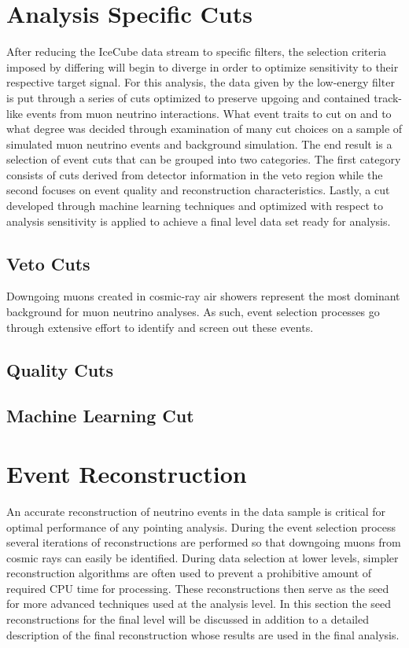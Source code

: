 \documentclass{gatech-thesis}
\begin{document}
\section{Analysis Specific Cuts}
After reducing the IceCube data stream to specific filters, the selection criteria imposed by differing will begin to diverge in order to optimize sensitivity to their respective target signal. For this analysis, the data given by the low-energy filter is put through a series of cuts optimized to preserve upgoing and contained track-like events from muon neutrino interactions. What event traits to cut on and to what degree was decided through examination of many cut choices on a sample of simulated muon neutrino events and background simulation. The end result is a selection of event cuts that can be grouped into two categories. The first category consists of cuts derived from detector information in the veto region while the second focuses on event quality and reconstruction characteristics. Lastly, a cut developed through machine learning techniques and optimized with respect to analysis sensitivity is applied to achieve a final level data set ready for analysis.

\subsection{Veto Cuts}
Downgoing muons created in cosmic-ray air showers represent the most dominant background for muon neutrino analyses. As such, event selection processes go through extensive effort to identify and screen out these events.

\subsection{Quality Cuts}

\subsection{Machine Learning Cut}



\section{Event Reconstruction}
An accurate reconstruction of neutrino events in the data sample is critical for optimal performance of any pointing analysis. During the event selection process several iterations of reconstructions are performed so that downgoing muons from cosmic rays can easily be identified. During data selection at lower levels, simpler reconstruction algorithms are often used to prevent a prohibitive amount of required CPU time for processing. These reconstructions then serve as the seed for more advanced techniques used at the analysis level. In this section the seed reconstructions for the final level will be discussed in addition to a detailed description of the final reconstruction whose results are used in the final analysis.
\end{document}
